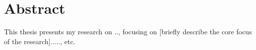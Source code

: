 \chapter*{Abstract}

This thesis presents my research on .., focusing on [briefly describe the core focus of the research]....., etc.

